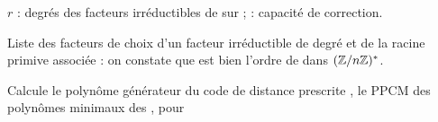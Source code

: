 \begin{maplegroup}
\begin{flushleft}
$r$ : degrés des facteurs irréductibles de 
 sur 
 ; 
 : capacité de correction.
\end{flushleft}

\end{maplegroup}
\begin{maplegroup}
\begin{mapleinput}
\end{mapleinput}

\end{maplegroup}
\begin{maplegroup}
\begin{flushleft}
Liste des facteurs de 
choix d'un facteur irréductible de degré 
 et de la racine primive associée :
on constate que 
 est bien l'ordre de 
 dans $(\mathbb{Z}/n\mathbb{Z})^*$.
\end{flushleft}

\end{maplegroup}
\begin{maplegroup}
\begin{mapleinput}
\end{mapleinput}

\mapleresult
\begin{maplelatex}
\end{maplelatex}

\end{maplegroup}
\begin{maplegroup}
\begin{flushleft}
Calcule le polynôme générateur du code de distance prescrite 
, le PPCM des polynômes minimaux des 
, pour 
\end{flushleft}

\end{maplegroup}
